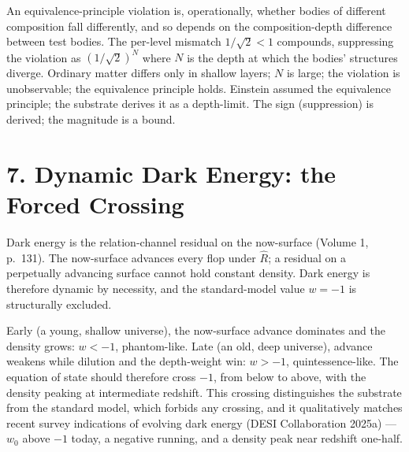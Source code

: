 \documentclass[11pt,oneside]{report}
\theoremstyle{definition}
\theoremstyle{remark}
\begin{document}
An equivalence-principle violation is, operationally, whether bodies of
different composition fall differently, and so depends on the
composition-depth difference between test bodies. The per-level mismatch
\ensuremath{1/\sqrt{2} < 1} compounds, suppressing the violation as
\ensuremath{(1/\sqrt{2})^N} where \ensuremath{N} is the depth at which the
bodies' structures diverge. Ordinary matter differs only in shallow
layers; \ensuremath{N} is large; the violation is unobservable; the
equivalence principle holds. Einstein assumed the equivalence principle;
the substrate derives it as a depth-limit. The sign (suppression) is
derived; the magnitude is a bound.

\section*{7. Dynamic Dark Energy: the Forced Crossing}

Dark energy is the relation-channel residual on the now-surface (Volume 1,
p.~131). The now-surface advances every flop under \ensuremath{\hat{R}}; a
residual on a perpetually advancing surface cannot hold constant density.
Dark energy is therefore dynamic by necessity, and the standard-model
value \ensuremath{w = -1} is structurally excluded.

Early (a young, shallow universe), the now-surface advance dominates and
the density grows: \ensuremath{w < -1}, phantom-like. Late (an old, deep
universe), advance weakens while dilution and the depth-weight win:
\ensuremath{w > -1}, quintessence-like. The equation of state should
therefore cross \ensuremath{-1}, from below to above, with the density
peaking at intermediate redshift. This crossing distinguishes the substrate from
the standard model, which forbids any crossing, and it qualitatively matches
recent survey indications of evolving dark energy (DESI Collaboration 2025a) ---
\ensuremath{w_0} above \ensuremath{-1} today, a negative running, and a density peak near redshift
one-half.
\end{document}
